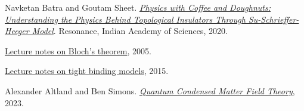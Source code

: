 \begin{thebibliography}{99}
Navketan Batra and Goutam Sheet. 
 \href{https://link.springer.com/article/10.1007/s12045-020-0995-x}{\textit{Physics with Coffee and Doughnuts: Understanding the Physics Behind Topological Insulators Through Su-Schrieffer-Heeger Model}}.
Resonance, Indian Academy of Sciences, 2020.

\href{https://bohr.physics.berkeley.edu/classes/221/s07/notes/blochban.pdf}{Lecture notes on Bloch's theorem}, 2005.

\href{https://www.physics.rutgers.edu/~eandrei/chengdu/reading/tight-binding.pdf}{Lecture notes on tight binding models}, 2015.

Alexander Altland and Ben Simons.
 \href{https://www.tcm.phy.cam.ac.uk/~bds10/tp3/secqu.pdf}{\textit{Quantum Condensed Matter Field Theory}}, 2023.

\end{thebibliography}